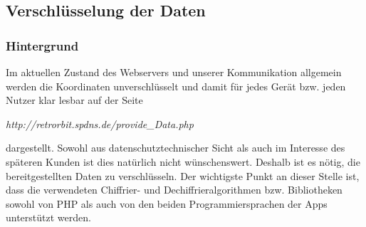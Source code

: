 \subsection{Verschlüsselung der Daten}
\subsubsection{Hintergrund }
Im aktuellen Zustand des Webservers und unserer Kommunikation allgemein werden die Koordinaten unverschlüsselt und damit für jedes Gerät bzw. jeden Nutzer klar lesbar auf der Seite
 \begin{center}
 	\textit{http://retrorbit.spdns.de/provide\_Data.php }
 \end{center}
 dargestellt. Sowohl aus datenschutztechnischer Sicht als auch im Interesse des späteren Kunden ist dies natürlich nicht wünschenswert. Deshalb ist es nötig, die bereitgestellten Daten zu verschlüsseln. Der wichtigste Punkt an dieser Stelle ist, dass die verwendeten Chiffrier- und Dechiffrieralgorithmen bzw. Bibliotheken sowohl von PHP als auch von den beiden Programmiersprachen der Apps unterstützt werden.

